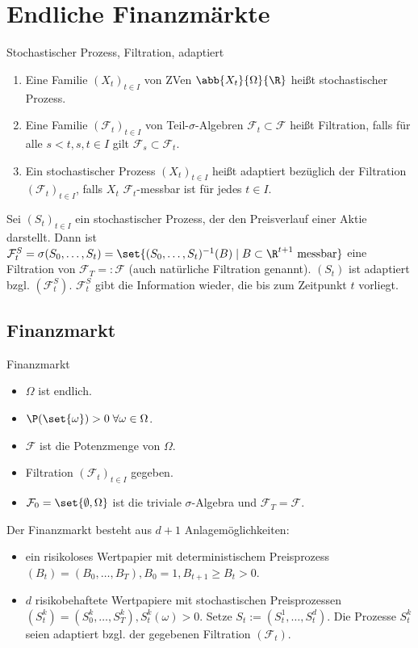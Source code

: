 \section{Endliche Finanzmärkte}

\begin{karte}{Stochastischer Prozess, Filtration, adaptiert}
\begin{enumerate}
    \item Eine Familie \((X_t)_{t\in I}\) von ZVen \(\abb{X_t}{\Omega}{\R}\) heißt stochastischer Prozess.
    \item Eine Familie \((\mathcal{F}_t)_{t\in I}\) von Teil-\(\sigma\)-Algebren \(\mathcal{F}_t \subset \mathcal{F}\) heißt Filtration, 
    falls für alle \(s < t, s,t\in I\) gilt \(\mathcal{F}_s \subset \mathcal{F}_t\).
    \item Ein stochastischer Prozess \((X_t)_{t\in I}\) heißt adaptiert bezüglich der Filtration \((\mathcal{F}_t)_{t\in I}\), 
    falls \(X_t\) \(\mathcal{F}_t\)-messbar ist für jedes \(t\in I\).
\end{enumerate}

Sei \((S_t)_{t\in I}\) ein stochastischer Prozess, der den Preisverlauf einer Aktie darstellt. 
Dann ist \(\mathcal{F}_t^S = \sigma(S_0, \ldots, S_t) = \set{ (S_0, \ldots, S_t)^{-1}(B) \;|\; B \subset \R^{t+1} \text{ messbar} }\)
eine Filtration von \(\mathcal{F}_T =: \mathcal{F}\) (auch natürliche Filtration genannt). \((S_t)\) ist adaptiert bzgl. \((\mathcal{F}_t^S)\).
\(\mathcal{F}_t^S\) gibt die Information wieder, die bis zum Zeitpunkt \(t\) vorliegt.
\end{karte}

\subsection{Finanzmarkt}

\begin{karte}{Finanzmarkt}
\begin{itemize}
    \item \(\Omega\) ist endlich.
    \item \(\P(\set{\omega}) > 0 \;\forall \omega \in \Omega\).
    \item \(\mathcal{F}\) ist die Potenzmenge von \(\Omega\).
    \item Filtration \((\mathcal{F}_t)_{t\in I}\) gegeben. 
    \item \(\mathcal{F}_0 = \set{\emptyset, \Omega}\) ist die triviale \(\sigma\)-Algebra und \(\mathcal{F}_T = \mathcal{F}\).
\end{itemize}
Der Finanzmarkt besteht aus \(d+1\) Anlagemöglichkeiten: 
\begin{itemize}
    \item ein risikoloses Wertpapier mit deterministischem Preisprozess \((B_t) = (B_0, \ldots, B_T), B_0 = 1, B_{t+1} \geq B_t > 0\).
    \item \(d\) risikobehaftete Wertpapiere mit stochastischen Preisprozessen \((S_t^k) = (S_0^k, \ldots, S_T^k), S_t^k(\omega) > 0\). 
    Setze \(S_t := (S_t^1, \ldots, S_t^d)\). Die Prozesse \(S_t^k\) seien adaptiert bzgl. der gegebenen Filtration \((\mathcal{F}_t)\).
\end{itemize}
\end{karte}

